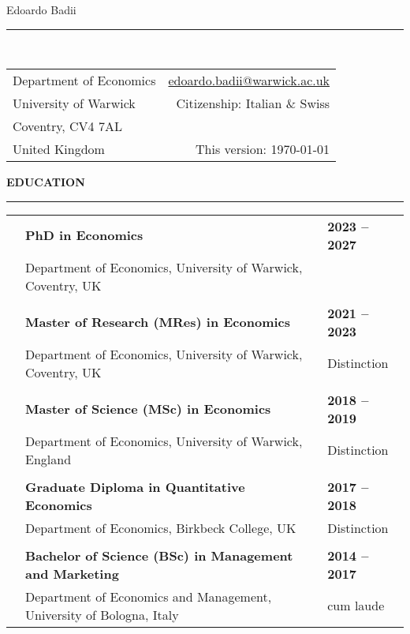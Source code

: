 \documentclass[a4paper,12pt]{article}
\begin{document}
{\centering \huge{Edoardo Badii} \\ \rule[8pt]{\textwidth}{0.8pt}} \\
\begin{tabularx}{\linewidth}{X r}
Department of Economics  & \href{mailto:edoardo.badii@warwick.ac.uk}{edoardo.badii@warwick.ac.uk} \\
University of Warwick	 & Citizenship: Italian \& Swiss \\
Coventry, CV4 7AL 		     &  \\
United Kingdom			 & This version: \monthyeardate\today
\end{tabularx}

\textbf{EDUCATION} \\ \rule[7pt]{\textwidth}{0.8pt}
\begin{tabularx}{\linewidth}{p{1em} X >{\raggedleft\arraybackslash}p{8em}}
& \textbf{PhD in Economics} 				& \textbf{2023 -- 2027} \\
& Department of Economics, University of Warwick, Coventry, UK   				& \\%
\\
& \textbf{Master of Research (MRes) in Economics} 				& \textbf{2021 -- 2023} \\
& Department of Economics, University of Warwick, Coventry, UK   				& Distinction \\%
\\
& \textbf{Master of Science (MSc) in Economics} 								& \textbf{2018 -- 2019} \\
& Department of Economics, University of Warwick, England		& Distinction \\%
\\
& \textbf{Graduate Diploma in Quantitative Economics} 								& \textbf{2017 -- 2018} \\
& Department of Economics, Birkbeck College, UK							& Distinction \\%
\\
& \textbf{Bachelor of Science (BSc) in Management and Marketing} 								& \textbf{2014 -- 2017} \\
& Department of Economics and Management, University of Bologna, Italy							& 110 cum laude \\%
\end{tabularx}


\end{document}
